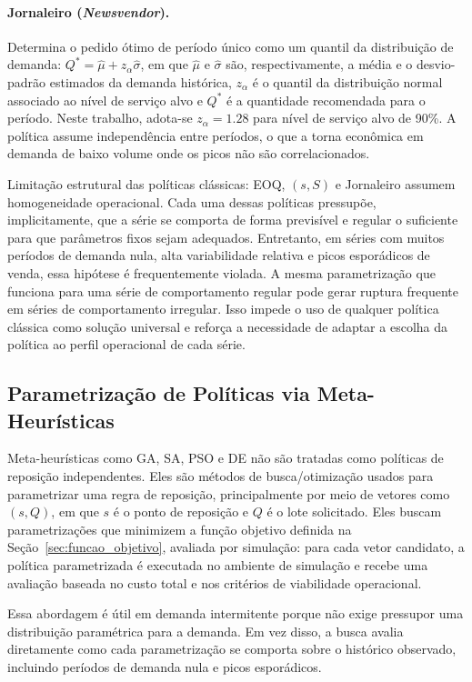 \paragraph{Jornaleiro (\textit{Newsvendor}).}
Determina o pedido ótimo de período único como um quantil da distribuição de demanda: $Q^* = \hat{\mu} + z_\alpha \hat{\sigma}$, em que $\hat{\mu}$ e $\hat{\sigma}$ são, respectivamente, a média e o desvio-padrão estimados da demanda histórica, $z_\alpha$ é o quantil da distribuição normal associado ao nível de serviço alvo e $Q^*$ é a quantidade recomendada para o período. Neste trabalho, adota-se $z_\alpha = 1.28$ para nível de serviço alvo de 90\%. A política assume independência entre períodos, o que a torna econômica em demanda de baixo volume onde os picos não são correlacionados.

\smallskip
\noindent Limitação estrutural das políticas clássicas: EOQ, $(s,S)$ e Jornaleiro assumem homogeneidade operacional. Cada uma dessas políticas pressupõe, implicitamente, que a série se comporta de forma previsível e regular o suficiente para que parâmetros fixos sejam adequados. Entretanto, em séries com muitos períodos de demanda nula, alta variabilidade relativa e picos esporádicos de venda, essa hipótese é frequentemente violada. A mesma parametrização que funciona para uma série de comportamento regular pode gerar ruptura frequente em séries de comportamento irregular. Isso impede o uso de qualquer política clássica como solução universal e reforça a necessidade de adaptar a escolha da política ao perfil operacional de cada série.

\subsection{Parametrização de Políticas via Meta-Heurísticas}

Meta-heurísticas como GA, SA, PSO e DE não são tratadas como políticas de reposição independentes. Eles são métodos de busca/otimização usados para parametrizar uma regra de reposição, principalmente por meio de vetores como $(s,Q)$, em que $s$ é o ponto de reposição e $Q$ é o lote solicitado. Eles buscam parametrizações que minimizem a função objetivo definida na Seção~\ref{sec:funcao_objetivo}, avaliada por simulação: para cada vetor candidato, a política parametrizada é executada no ambiente de simulação e recebe uma avaliação baseada no custo total e nos critérios de viabilidade operacional.

Essa abordagem é útil em demanda intermitente porque não exige pressupor uma distribuição paramétrica para a demanda. Em vez disso, a busca avalia diretamente como cada parametrização se comporta sobre o histórico observado, incluindo períodos de demanda nula e picos esporádicos.

